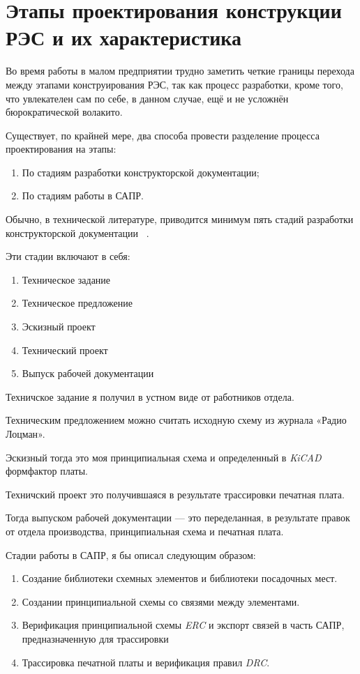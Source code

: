 \section{Этапы проектирования конструкции РЭС и их характеристика}

Во время работы в малом предприятии трудно заметить
четкие границы перехода между этапами конструирования РЭС,
так как процесс разработки, кроме того, что увлекателен сам по себе,
в данном случае, ещё и не усложнён бюрократической волакито.

Существует, по крайней мере, два способа
провести разделение процесса проектирования
на этапы:

\begin{enumerate}
\item По стадиям разработки конструкторской документации;
\item По стадиям работы в САПР.
\end{enumerate}

Обычно,
в технической литературе, приводится минимум пять стадий
разработки
конструкторской документации ~\cite{Rotkop1976}.

Эти стадии включают в себя:

\begin{enumerate}
\item Техническое задание
\item Техническое предложение
\item Эскизный проект
\item Технический проект
\item Выпуск рабочей документации
\end{enumerate}

Техничское задание я получил в устном виде от работников отдела.

Техническим предложением можно считать
исходную схему из журнала «Радио Лоцман».

Эскизный тогда это моя принципиальная схема и определенный в \textit{KiCAD}
формфактор платы.

Техничский проект это получившаяся в результате трассировки печатная плата.

Тогда выпуском рабочей документации — это переделанная,
в результате правок от отдела производства,
принципиальная схема и печатная плата.

Стадии работы в САПР, я бы описал следующим образом:
\begin{enumerate}
\item Создание библиотеки схемных элементов и библиотеки посадочных мест.
\item Создании принципиальной схемы со связями между элементами.
\item Верификация принципиальной схемы \textit{ERC}
  и экспорт связей в часть САПР, предназначенную для трассировки
\item Трассировка печатной платы и верификация правил  \textit{DRC}.
\end{enumerate}

